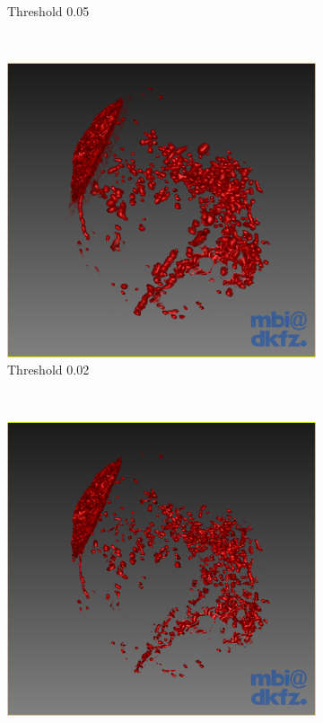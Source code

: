 \begin{figure}[H]
\begin{subfigure}[b]{0.5\textwidth}
    \caption{Threshold 0.05}
    \label{fig:thresholdingvariation1threshold1}
  \end{subfigure}\\[11pt]
  \begin{subfigure}[b]{0.5\textwidth}
    \includegraphics[width=\textwidth]{images/thresholding/thresholdvariation1threshold2.png}
    \caption{Threshold 0.02}
    \label{fig:thresholdingvariation1threshold2}  
  \end{subfigure}%
  ~ %
  \begin{subfigure}[b]{0.5\textwidth}
    \includegraphics[width=\textwidth]{images/thresholding/thresholdvariation1threshold3.png}

\end{subfigure}
\end{figure}
